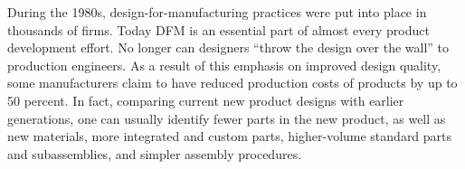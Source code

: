 
\begin{conclusion}
  During the 1980s, design-for-manufacturing practices were put into place in thousands of firms. Today DFM is an essential part of almost every product development effort. No longer can designers ``throw the design over the wall'' to production engineers. As a result of this emphasis on improved design quality, some manufacturers claim to have reduced production costs of products by up to 50 percent. In fact, comparing current new product designs with earlier generations, one can usually identify fewer parts in the new product, as well as new materials, more integrated and custom parts, higher-volume standard parts and subassemblies, and simpler assembly procedures.
\end{conclusion}
